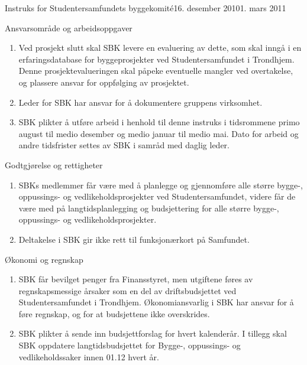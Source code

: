 \begin{instruks}{Instruks for Studentersamfundets byggekomité}{16. desember 2010}{1. mars 2011}
\begin{instruksledd}{ Ansvarsområde og arbeidsoppgaver}
\begin{enumerate}
                tilgjengelig hos daglig leder.
            \item Ved prosjekt slutt skal SBK levere en evaluering av dette, som skal inngå
                i en erfaringsdatabase for
                byggeprosjekter ved Studentersamfundet i Trondhjem. Denne
                prosjektevalueringen skal påpeke eventuelle
                mangler ved overtakelse, og plassere ansvar for oppfølging av prosjektet.
            \item
                Leder for SBK har ansvar for å dokumentere gruppens virksomhet.
            \item SBK plikter å utføre arbeid i henhold til denne instruks i tidsrommene
                primo august til medio desember og
                medio januar til medio mai. Dato for arbeid og andre tidsfrister settes av
                SBK i samråd med daglig leder.
        \end{enumerate}
    \end{instruksledd}

    \begin{instruksledd}{Godtgjørelse og rettigheter}
        \begin{enumerate}
            \item SBKs medlemmer får være med å planlegge og gjennomføre alle større bygge-,
                oppussings- og
                vedlikeholdsprosjekter ved Studentersamfundet, videre får de være med på
                langtidsplanlegging og
                budsjettering for alle større bygge-, oppussings- og vedlikeholdsprosjekter.
            \item Deltakelse i SBK gir ikke rett til funksjonærkort på Samfundet.
        \end{enumerate}
    \end{instruksledd}

    \begin{instruksledd}{Økonomi og regnskap}
        \begin{enumerate}
            \item SBK får bevilget penger fra Finansstyret, men utgiftene føres av
                regnskapsmessige årsaker som en del av
                driftsbudsjettet ved Studentersamfundet i Trondhjem. Økonomiansvarlig i SBK har
                ansvar for å føre
                regnskap, og for at budsjettene ikke overskrides.
            \item SBK plikter å sende inn budsjettforslag for hvert kalenderår. I tillegg skal
                SBK oppdatere langtidsbudsjettet
                for Bygge-, oppussings- og vedlikeholdssaker innen 01.12 hvert år.
        \end{enumerate}
    \end{instruksledd}


\end{instruks}
